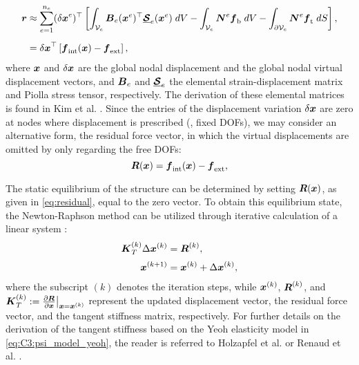 %
\begin{align}
\boldsymbol{r}	& \approx \sum_{e=1}^{n_e} ({\delta {\boldsymbol{x}}}^e)^\top \left[\int_{\mathcal{V}_e} {\boldsymbol{B}}_e({\boldsymbol{x}}^e)^\top \underline{\boldsymbol{\mathcal{S}}}_e({\boldsymbol{x}}^e) \; dV  - \int_{\mathcal{V}_e} {\boldsymbol{N}}^{e} {\boldsymbol{f}}_{\textrm{b}} \; dV  - \int_{\partial \mathcal{V}_e} {\boldsymbol{N}}^{e} {\boldsymbol{f}}_{\textrm{t}} \; dS \right], \notag \\[0.5em]
& = {\delta {\boldsymbol{x}}}^\top \left[ {\boldsymbol{f}}_{\textrm{int}}({\boldsymbol{x}}) - {\boldsymbol{f}}_{\textrm{ext}} \right],
\end{align}
%
where ${\boldsymbol{x}}$ and $\delta {\boldsymbol{x}}$ are the global nodal displacement and the global nodal virtual displacement vectors, and ${\boldsymbol{B}}_e$ and $\underline{\boldsymbol{\mathcal{S}}}_e$ the elemental strain-displacement matrix and Piolla stress tensor, respectively. The derivation of these elemental matrices is found in Kim et al. \cite{Kim2018}. Since the entries of the displacement variation ${\delta {\boldsymbol{x}}}$ are zero at nodes where displacement is prescribed (\ie, fixed DOFs), we may consider an alternative form, the residual force vector, in which the virtual displacements are omitted by only regarding the free DOFs:
%
\begin{equation}
{\boldsymbol{R}}({\boldsymbol{x}}) = {\boldsymbol{f}}_{\textrm{int}}({\boldsymbol{x}}) - {\boldsymbol{f}}_{\textrm{ext}},
\label{eq:residual}
\end{equation}
%

The static equilibrium of the structure can be determined by setting ${\boldsymbol{R}}({\boldsymbol{x}})$, as given in \eqref{eq:residual}, equal to the zero vector. To obtain this equilibrium state, the Newton-Raphson method can be utilized through iterative calculation of a linear system \cite{Gain2013Dec,Kim2018,Holzapfel2002}:
%
\begin{align}
{\boldsymbol{K}}_T^{(k)} \Delta {\boldsymbol{x}}^{(k)} & = {\boldsymbol{R}}^{(k)}, \notag \\[0.25em]
{\boldsymbol{x}}^{(k+1)} & = {\boldsymbol{x}}^{(k)} + \Delta {\boldsymbol{x}}^{(k)}, \notag
\end{align}
%
where the subscript $(k)$ denotes the iteration steps, while ${\boldsymbol{x}}^{(k)}$, ${\boldsymbol{R}}^{(k)}$, and ${\boldsymbol{K}}_T^{(k)}:=\tfrac{\partial {\boldsymbol{R}}}{\partial {\boldsymbol{x}}}\big|_{{\boldsymbol{x}} = {\boldsymbol{x}}^{(k)}}$ represent the updated displacement vector, the residual force vector, and the tangent stiffness matrix, respectively. For further details on the derivation of the tangent stiffness based on the Yeoh elasticity model in \eqref{eq:C3:psi_model_yeoh}, the reader is referred to Holzapfel et al. \cite{Holzapfel2002} or Renaud et al. \cite{Renaud2011}.

